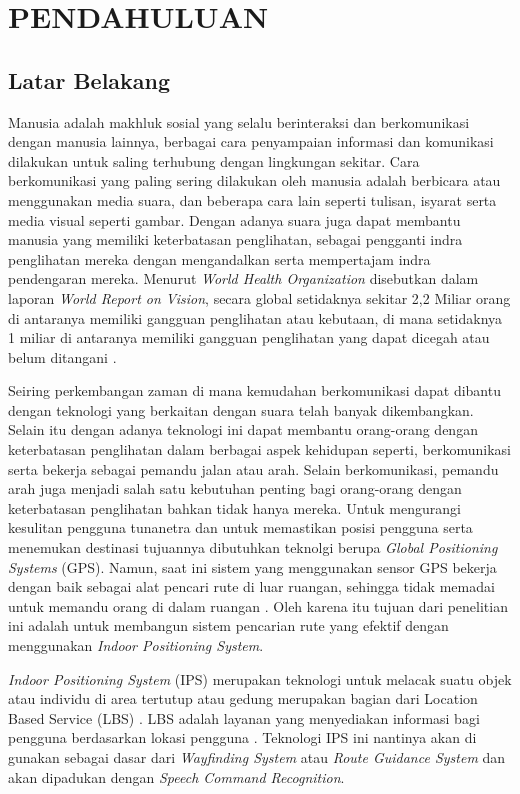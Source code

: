 \fancyhf{} 
\fancyfoot[C]{\thepage}

\chapter{PENDAHULUAN}

\section{Latar Belakang}
Manusia adalah makhluk sosial yang selalu berinteraksi dan berkomunikasi dengan manusia lainnya, berbagai cara penyampaian informasi dan komunikasi dilakukan untuk saling terhubung dengan lingkungan sekitar. Cara berkomunikasi yang paling sering dilakukan oleh manusia adalah berbicara atau menggunakan media suara, dan beberapa cara lain seperti tulisan, isyarat serta media visual seperti gambar. Dengan adanya suara juga dapat membantu manusia yang memiliki keterbatasan penglihatan, sebagai pengganti indra penglihatan mereka dengan mengandalkan serta mempertajam indra pendengaran mereka. Menurut \textit{World Health Organization} disebutkan dalam laporan \textit{World Report on Vision}, secara global setidaknya sekitar 2,2 Miliar orang di antaranya memiliki gangguan penglihatan atau kebutaan, di mana setidaknya 1 miliar di antaranya memiliki gangguan penglihatan yang dapat dicegah atau belum ditangani \citep{who2019}. 

Seiring perkembangan zaman di mana kemudahan berkomunikasi dapat dibantu dengan teknologi yang berkaitan dengan suara telah banyak dikembangkan. Selain itu dengan adanya teknologi ini dapat membantu orang-orang dengan keterbatasan penglihatan dalam berbagai aspek kehidupan seperti, berkomunikasi serta bekerja sebagai pemandu jalan atau arah. Selain berkomunikasi, pemandu arah juga menjadi salah satu kebutuhan penting bagi orang-orang dengan keterbatasan penglihatan bahkan tidak hanya mereka. 
Untuk mengurangi kesulitan pengguna tunanetra dan untuk memastikan posisi pengguna
serta menemukan destinasi tujuannya dibutuhkan teknolgi berupa \textit{Global Positioning
Systems} (GPS). Namun, saat ini sistem yang menggunakan sensor GPS bekerja dengan baik sebagai alat pencari rute di luar ruangan, sehingga tidak memadai untuk memandu orang di dalam ruangan \citep{ko2017vision}. Oleh karena itu tujuan dari penelitian ini adalah untuk membangun sistem pencarian rute yang efektif dengan menggunakan \textit{Indoor Positioning System}.

\par \textit{Indoor Positioning System} (IPS) merupakan teknologi untuk melacak suatu objek atau individu di area tertutup atau gedung merupakan bagian dari Location Based Service (LBS) \citep{brena2017evolution}. LBS adalah layanan yang menyediakan informasi bagi pengguna berdasarkan lokasi pengguna \citep{virrantaus2001developing}. Teknologi IPS ini nantinya akan di gunakan sebagai dasar dari \textit{Wayfinding System} atau \textit{Route Guidance System} dan akan dipadukan dengan \textit{Speech Command Recognition}.

